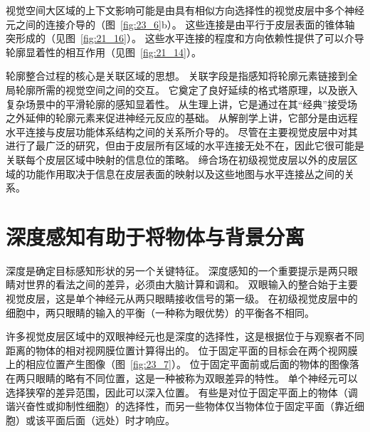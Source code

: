视觉空间大区域的上下文影响可能是由具有相似方向选择性的视觉皮层中多个神经元之间的连接介导的（图~\ref{fig:23_6}b）。
这些连接是由平行于皮层表面的锥体轴突形成的（见图~\ref{fig:21_16}）。
这些水平连接的程度和方向依赖性提供了可以介导轮廓显着性的相互作用（见图~\ref{fig:21_14}）。


轮廓整合过程的核心是关联区域的思想。
关联字段是指感知将轮廓元素链接到全局轮廓所需的视觉空间之间的交互。
它奠定了良好延续的格式塔原理，以及嵌入复杂场景中的平滑轮廓的感知显着性。
从生理上讲，它是通过在其“经典”接受场之外延伸的轮廓元素来促进神经元反应的基础。
从解剖学上讲，它部分是由远程水平连接与皮层功能体系结构之间的关系所介导的。
尽管在主要视觉皮层中对其进行了最广泛的研究，但由于皮层所有区域的水平连接无处不在，因此它很可能是关联每个皮层区域中映射的信息位的策略。
缔合场在初级视觉皮层以外的皮层区域的功能作用取决于信息在皮层表面的映射以及这些地图与水平连接丛之间的关系。



\section{深度感知有助于将物体与背景分离}

深度是确定目标感知形状的另一个关键特征。
深度感知的一个重要提示是两只眼睛对世界的看法之间的差异，必须由大脑计算和调和。
双眼输入的整合始于主要视觉皮层，这是单个神经元从两只眼睛接收信号的第一级。
在初级视觉皮层中的细胞中，两只眼睛的输入的平衡（一种称为眼优势）的平衡各不相同。


许多视觉皮层区域中的双眼神经元也是深度的选择性，这是根据位于与观察者不同距离的物体的相对视网膜位置计算得出的。
位于固定平面的目标会在两个视网膜上的相应位置产生图像（图~\ref{fig:23_7}）。
位于固定平面前或后面的物体的图像落在两只眼睛的略有不同位置，这是一种被称为双眼差异的特性。
单个神经元可以选择狭窄的差异范围，因此可以深入位置。
有些是对位于固定平面上的物体（调谐兴奋性或抑制性细胞）的选择性，而另一些物体仅当物体位于固定平面（靠近细胞）或该平面后面（远处）时才响应。



